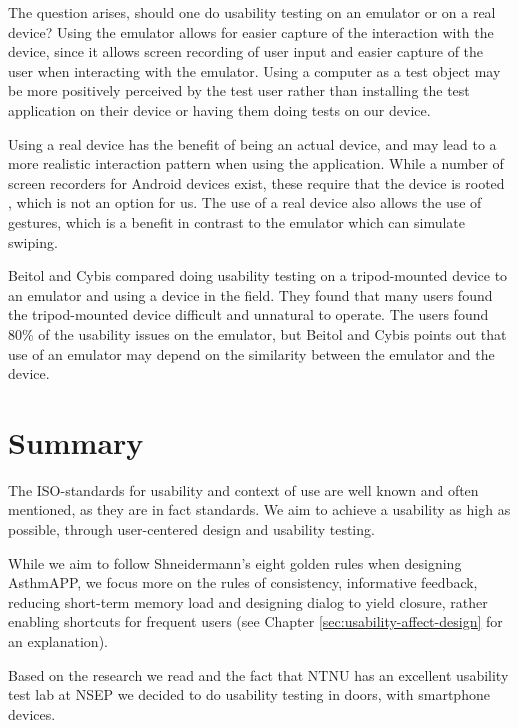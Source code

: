 The question arises, should one do usability testing on an emulator or on a real device?
Using the emulator allows for easier capture of the interaction with the device, since it allows screen recording of user input and easier capture of the user when interacting with the emulator. Using a computer as a test object may be more positively perceived by the test user rather than installing the test application on their device or having them doing tests on our device. 

Using a real device has the benefit of being an actual device, and may lead to a more realistic interaction pattern when using the application. While a number of screen recorders for Android devices exist, these require that the device is rooted , which is not an option for us. 
The use of a real device also allows the use of gestures, which is a benefit in contrast to the emulator which can simulate swiping. 


Beitol and Cybis\cite{betiol2005usability} compared doing usability testing on a tripod-mounted device to an emulator and using a device in the field. They found that many users found the tripod-mounted device difficult and unnatural to operate. The users found 80\% of the usability issues on the emulator, but Beitol and Cybis points out that use of an emulator may depend on the similarity between the emulator and the device. 



\section{Summary}
\label{sec:usabilitysummary}

The ISO-standards for usability and context of use\cite{isousability} are well known and often mentioned, as they are in fact standards. We aim to achieve a usability as high as possible, through user-centered design and usability testing. 

While we aim to follow Shneidermann's eight golden rules\cite{shneiderman2003designing} when designing AsthmAPP, we focus more on the rules of consistency, informative feedback, reducing short-term memory load and designing dialog to yield closure, rather enabling shortcuts for frequent users (see Chapter \ref{sec:usability-affect-design} for an explanation).

Based on the research we read and the fact that NTNU has an excellent usability test lab at NSEP we decided to do usability testing in doors, with smartphone devices. 